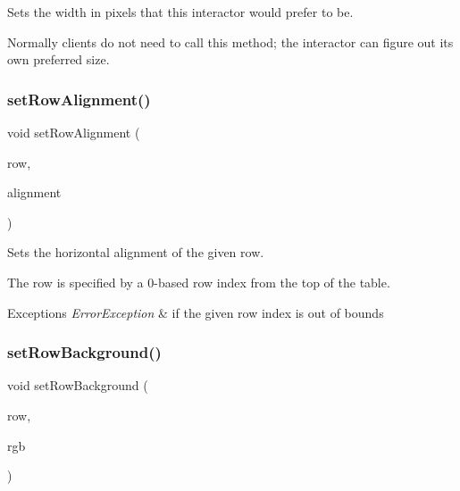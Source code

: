 Sets the width in pixels that this interactor would prefer to be. 

Normally clients do not need to call this method; the interactor can figure out its own preferred size. \mbox{\label{classGTable_ac6a47ba68c502b7d8dc776beeeffccc3}} 
\subsubsection{\texorpdfstring{set\+Row\+Alignment()}{setRowAlignment()}}
{\footnotesize\ttfamily void set\+Row\+Alignment (\begin{DoxyParamCaption}\item[{int}]{row,  }\item[{Horizontal\+Alignment}]{alignment }\end{DoxyParamCaption})\hspace{0.3cm}{\ttfamily [virtual]}}



Sets the horizontal alignment of the given row. 

The row is specified by a 0-\/based row index from the top of the table. 
\begin{DoxyExceptions}{Exceptions}
{\em Error\+Exception} & if the given row index is out of bounds \\
\hline
\end{DoxyExceptions}
\mbox{\label{classGTable_a85ee577aabd189ed64a5c9f66ba61fd2}} 
\subsubsection{\texorpdfstring{set\+Row\+Background()}{setRowBackground()}\hspace{0.1cm}{\footnotesize\ttfamily [1/2]}}
{\footnotesize\ttfamily void set\+Row\+Background (\begin{DoxyParamCaption}\item[{int}]{row,  }\item[{int}]{rgb }\end{DoxyParamCaption})\hspace{0.3cm}{\ttfamily [virtual]}}



